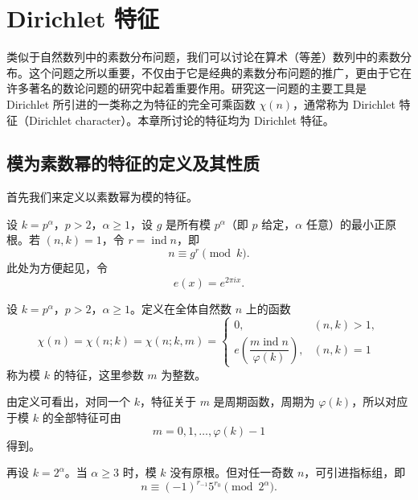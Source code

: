 
\chapter{Dirichlet 特征}
\label{chap:dirichlet-characters}

类似于自然数列中的素数分布问题，我们可以讨论在算术（等差）数列中的素数分布。这个问题之所以重要，不仅由于它是经典的素数分布问题的推广，更由于它在许多著名的数论问题的研究中起着重要作用。研究这一问题的主要工具是 Dirichlet 所引进的一类称之为特征的完全可乘函数 $\chi(n)$，通常称为 Dirichlet 特征（Dirichlet character）。本章所讨论的特征均为 Dirichlet 特征。

\section{模为素数幂的特征的定义及其性质}

首先我们来定义以素数幂为模的特征。

设 $k=p^\alpha$，$p>2$，$\alpha\geq 1$，设 $g$ 是所有模 $p^\alpha$（即 $p$ 给定，$\alpha$ 任意）的最小正原根。若 $(n,k)=1$，令 $r=\operatorname{ind} n$，即
\[
	n\equiv g^r\pmod k.
\]
此处为方便起见，令
\[
	e(x)=e^{2\pi i x}.
\]

\begin{definition}[原文 定义 1]
	设 $k=p^\alpha$，$p>2$，$\alpha\geq 1$。定义在全体自然数 $n$ 上的函数
	\begin{equation}
		\chi(n)=\chi(n;k)=\chi(n;k,m)=
		\begin{cases}
			0, & (n,k)>1,\\
			e\left(\dfrac{m\operatorname{ind}n}{\varphi(k)}\right), & (n,k)=1
		\end{cases}
		\tag{1}
	\end{equation}
	称为模 $k$ 的特征，这里参数 $m$ 为整数。
\end{definition}

由定义可看出，对同一个 $k$，特征关于 $m$ 是周期函数，周期为 $\varphi(k)$，所以对应于模 $k$ 的全部特征可由
\[
	m=0,1,\ldots,\varphi(k)-1
\]
得到。

再设 $k=2^\alpha$。当 $\alpha\geq 3$ 时，模 $k$ 没有原根。但对任一奇数 $n$，可引进指标组，即
\[
	n\equiv (-1)^{r_{-1}}5^{r_0}\pmod {2^\alpha}.
\]

